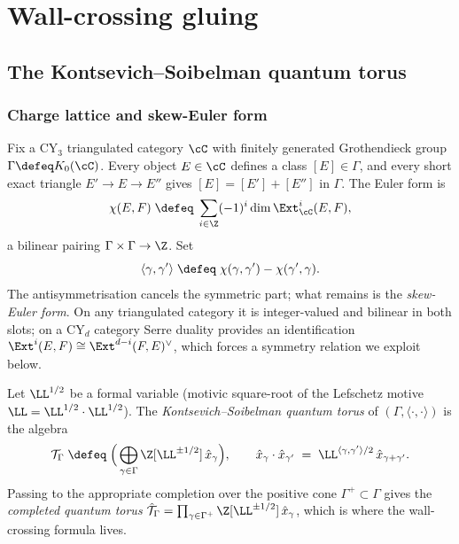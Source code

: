 \providecommand{\cref}[1]{\ref{#1}}
\section{Wall-crossing gluing}
\label{sec:gluing:wallcrossing}
\label{part:gluing-wallcrossing}
\subsection{The Kontsevich--Soibelman quantum torus}
\label{sec:ks-quantum-torus}

\subsubsection{Charge lattice and skew-Euler form}

Fix a CY$_3$ triangulated category $\cC$ with finitely generated
Grothendieck group $\Gamma \defeq K_0(\cC)$. Every object $E \in \cC$
defines a class $[E] \in \Gamma$, and every short exact triangle
$E' \to E \to E''$ gives $[E] = [E'] + [E'']$ in $\Gamma$. The Euler
form is
\[
 \chi(E, F) \;\defeq\; \sum_{i \in \Z} (-1)^i \dim \Ext^i_\cC(E, F),
\]
a bilinear pairing $\Gamma \times \Gamma \to \Z$. Set
\[
 \langle \gamma, \gamma' \rangle \;\defeq\; \chi(\gamma, \gamma') - \chi(\gamma', \gamma).
\]
The antisymmetrisation cancels the symmetric part; what remains is the
\emph{skew-Euler form}. On any triangulated category it is integer-valued and
bilinear in both slots; on a CY$_d$ category Serre duality provides an
identification $\Ext^i(E, F) \cong \Ext^{d-i}(F, E)^\vee$, which forces a
symmetry relation we exploit below.

\begin{definition}
 \label{def:ks-quantum-torus}
 Let $\LL^{1/2}$ be a formal variable (motivic square-root of the Lefschetz
 motive $\LL = \LL^{1/2} \cdot \LL^{1/2}$). The \emph{Kontsevich--Soibelman
 quantum torus} of $(\Gamma, \langle \cdot, \cdot \rangle)$ is the algebra
 \[
 \mathcal{T}_\Gamma \;\defeq\; \Big(\bigoplus_{\gamma \in \Gamma} \Z[\LL^{\pm 1/2}] \,\hat{x}_\gamma \Big),
 \qquad
 \hat{x}_\gamma \cdot \hat{x}_{\gamma'} \;=\; \LL^{\langle \gamma, \gamma' \rangle / 2}\, \hat{x}_{\gamma + \gamma'}.
 \]
 Passing to the appropriate completion over the positive cone
 $\Gamma^+ \subset \Gamma$ gives the \emph{completed quantum torus}
 $\hat{\mathcal{T}}_\Gamma = \prod_{\gamma \in \Gamma^+} \Z[\LL^{\pm 1/2}]\,\hat{x}_\gamma$, which is where
 the wall-crossing formula lives.
\end{definition}

